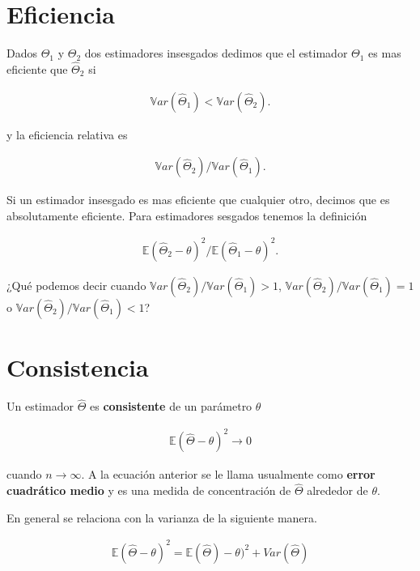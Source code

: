 \documentclass{article}
\newcommand{\Esp}{\mathbb{E}}
\newcommand{\Var}{\mathbb{V}ar}
\begin{document}
\section{Eficiencia}

Dados $\Theta_1$ y $\Theta_2$ dos estimadores insesgados  dedimos que el estimador $\Theta_1$ es mas eficiente que $\hat{\Theta}_2$ si 

\begin{align*}
    \Var(\hat{\Theta}_1) < \Var(\hat{\Theta}_2).
\end{align*}

y la eficiencia relativa es 

\begin{align*}
    \Var(\hat{\Theta}_2) / \Var(\hat{\Theta}_1).
\end{align*}

Si un estimador insesgado es mas eficiente que cualquier otro, decimos que es absolutamente eficiente. Para estimadores sesgados tenemos la definición


\begin{align*}
    \Esp(\hat{\Theta}_2-\theta)^2 / \Esp(\hat{\Theta}_1-\theta)^2.
\end{align*}

¿Qué podemos decir cuando $\Var(\hat{\Theta}_2) / \Var(\hat{\Theta}_1) >1$, $\Var(\hat{\Theta}_2) / \Var(\hat{\Theta}_1) = 1$ o $\Var(\hat{\Theta}_2) / \Var(\hat{\Theta}_1) < 1$?

\section{Consistencia}

Un estimador $\hat{\Theta}$ es \textbf{consistente} de un parámetro $\theta$ 

\begin{align*}
     \Esp(\hat{\Theta}-\theta)^2 \to 0
\end{align*}

cuando $n \to \infty$. A la ecuación anterior se le llama usualmente como \textbf{error cuadrático medio} y es una medida de concentración de $\hat{\Theta}$ alrededor de $\theta$. 

En general se relaciona con la varianza de la siguiente manera. 

\begin{align*}
     \Esp(\hat{\Theta}-\theta)^2 = \Esp(\hat{\Theta})-\theta)^2 +Var(\hat{\Theta})
\end{align*}
\end{document}
